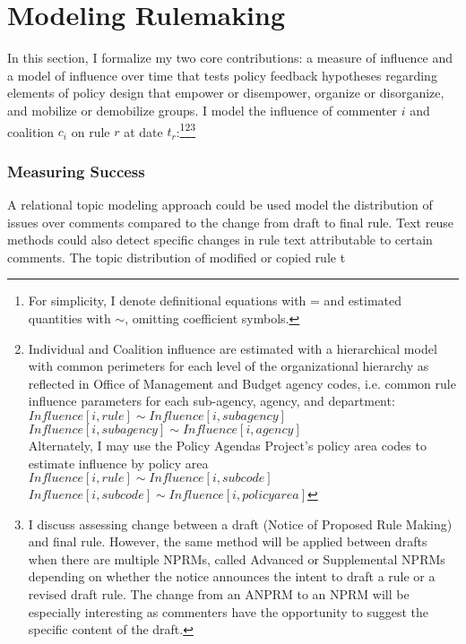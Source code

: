 \section{Modeling Rulemaking}

In this section, I formalize my two core contributions: a measure of influence and a model of influence over time that tests policy feedback hypotheses regarding elements of policy design that empower or disempower, organize or disorganize, and mobilize or demobilize groups. I model the influence of commenter $i$ and coalition $c_i$ on rule $r$ at date $t_r$:\footnote{For simplicity, I denote definitional equations with = and estimated quantities with $\sim$, omitting coefficient symbols.}\footnote{Individual and Coalition influence are estimated with a hierarchical model with common perimeters for each level of the organizational hierarchy as reflected in Office of Management and Budget agency codes, i.e. common rule influence parameters for each sub-agency, agency, and department: \\
$Influence[i, rule] \sim Influence[i, sub agency]$ \\
$Influence[i, sub agency] \sim Influence[i, agency]$\\
	Alternately, I may use the Policy Agendas Project's policy area codes to estimate influence by policy area\\
$Influence[i, rule] \sim Influence[i, sub code]$ \\ 
$Influence[i, sub code] \sim Influence[i, policy area]$}\footnote{I discuss assessing change between a draft (Notice of Proposed Rule Making) and final rule. However, the same method will be applied between drafts when there are multiple NPRMs, called Advanced or Supplemental NPRMs depending on whether the notice announces the intent to draft a rule or a revised draft rule. The change from an ANPRM to an NPRM will be especially interesting as commenters have the opportunity to suggest the specific content of the draft.}


\subsubsection{Measuring Success}

A relational topic modeling approach could be used model the distribution of issues over comments compared to the change from draft to final rule. Text reuse methods could also detect specific changes in rule text attributable to certain comments. The topic distribution of modified or copied rule t



